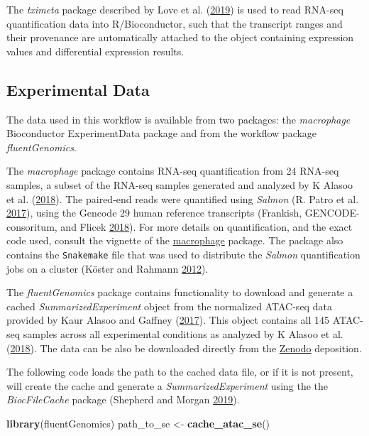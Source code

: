 \documentclass[
]{article}
\newenvironment{Shaded}{}{}
\newcommand{\KeywordTok}[1]{\textcolor[rgb]{0.00,0.44,0.13}{\textbf{#1}}}
\newcommand{\NormalTok}[1]{#1}
\newcommand{\StringTok}[1]{\textcolor[rgb]{0.25,0.44,0.63}{#1}}
\begin{document}
The \emph{tximeta} package described by Love et al. (\protect\hyperlink{ref-Love2019-tximeta}{2019}) is used to read RNA-seq
quantification data into R/Bioconductor, such that the transcript ranges and
their provenance are automatically attached to the object containing expression
values and differential expression results.

\hypertarget{experimental-data}{%
\subsection{Experimental Data}\label{experimental-data}}

The data used in this workflow is available from two packages: the \emph{macrophage}
Bioconductor ExperimentData package and from the workflow package
\emph{fluentGenomics}.

The \emph{macrophage} package contains RNA-seq quantification from 24 RNA-seq
samples, a subset of the RNA-seq samples generated and analyzed by K Alasoo et al. (\protect\hyperlink{ref-alasoo}{2018}). The
paired-end reads were quantified using \emph{Salmon} (R. Patro et al. \protect\hyperlink{ref-salmon}{2017}), using the Gencode 29
human reference transcripts (Frankish, GENCODE-consoritum, and Flicek \protect\hyperlink{ref-gencode}{2018}). For more details on quantification, and
the exact code used, consult the vignette of the
\href{http://bioconductor.org/packages/macrophage}{macrophage} package. The package
also contains the \texttt{Snakemake} file that was used to distribute the \emph{Salmon}
quantification jobs on a cluster (Köster and Rahmann \protect\hyperlink{ref-snakemake}{2012}).

The \emph{fluentGenomics} package contains functionality to download and generate a
cached \emph{SummarizedExperiment} object from the normalized ATAC-seq data provided
by Kaur Alasoo and Gaffney (\protect\hyperlink{ref-alasooZenodo}{2017}). This object contains all 145 ATAC-seq samples across all
experimental conditions as analyzed by K Alasoo et al. (\protect\hyperlink{ref-alasoo}{2018}). The data can be also be
downloaded directly from the
\href{https://zenodo.org/record/1188300\#.XIAhXlNKjOQ}{Zenodo} deposition.

The following code loads the path to the cached data file, or if it is not
present, will create the cache and generate a \emph{SummarizedExperiment} using the
the \emph{BiocFileCache} package (Shepherd and Morgan \protect\hyperlink{ref-bcfilecache}{2019}).

\begin{Shaded}
\begin{Highlighting}[]
\KeywordTok{library}\NormalTok{(fluentGenomics)}
\NormalTok{path_to_se <-}\StringTok{ }\KeywordTok{cache_atac_se}\NormalTok{()}
\end{Highlighting}
\end{Shaded}
\end{document}
